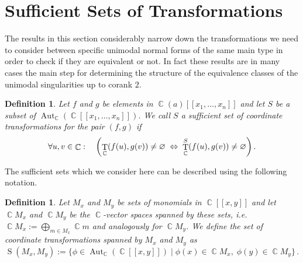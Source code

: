\documentclass{amsproc}
\newtheorem{defn}[theorem]{Definition}
\theoremstyle{definition}
\let\originalleft\left
\let\originalright\right
\renewcommand{\left}{\mathopen{}\mathclose\bgroup\originalleft}
\renewcommand{\right}{\aftergroup\egroup\originalright}
\DeclareMathOperator{\C}{\mathbb{C}}
\DeclareMathOperator{\s}{S}
\DeclareMathOperator{\T}{T}
\DeclareMathOperator{\Aut}{Aut}
\begin{document}
\section{Sufficient Sets of Transformations}\label{sec:sufficient_sets}

The results in this section considerably narrow down the transformations we
need to consider between specific unimodal normal forms of the same main type
in order to check if they are equivalent or not. In fact these results are in
many cases the main step for determining the structure of the equivalence
classes of the unimodal singularities up to corank $2$.

\begin{defn}
Let $f$ and $g$ be elements in $\C(a)[[x_1,\ldots,x_n]]$ and let $S$ be a
subset of $\Aut_{\C}(\C[[x_1,\ldots,x_n]])$. We call $S$ a sufficient set of
coordinate transformations for the pair $(f, g)$ if
\[
\forall u,v \in \C: \quad
\left(\T_{\C}(f(u),g(v)) \neq \varnothing
\;\Leftrightarrow\; \T_{\C}^S(f(u),g(v)) \neq \varnothing\right) \,.
\]
\end{defn}

The sufficient sets which we consider here can be described using the
following notation.

\begin{defn}
Let $M_x$ and $M_y$ be sets of monomials in $\C[[x,y]]$ and let $\C\! M_x$ and
$\C\! M_y$ be the $\C$-vector spaces spanned by these sets, i.e.\@
$\C\! M_x := \bigoplus_{m \in M_x} \C m$ and analogously for $\C\! M_y$. We
define the set of coordinate transformations spanned by $M_x$ and $M_y$ as
\[
\s(M_x, M_y) := \{ \phi \in \Aut_{\C}(\C[[x,y]]) \mid
\phi(x) \in \C\! M_x,\; \phi(y) \in \C\! M_y \} \,.
\]
\end{defn}
\end{document}
